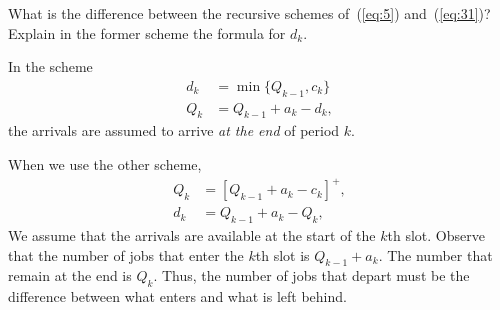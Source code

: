 \begin{question}
  What is the difference between the recursive schemes of~(\ref{eq:5}) and~(\ref{eq:31})? Explain in the former scheme
  the formula for $d_k$.  
\begin{solution}
  In the scheme
  \begin{equation*}
    \begin{split}
      d_k &= \min\{Q_{k-1}, c_k\}\\
Q_k &= Q_{k-1} + a_k - d_k,
    \end{split}
  \end{equation*}
the arrivals are assumed to arrive \emph{at the end} of period $k$. 

When we use the other scheme,
  \begin{equation*}
    \begin{split}
      Q_k &= [Q_{k-1} + a_k - c_k]^+,\\
      d_k &= Q_{k-1} + a_k - Q_k,
    \end{split}
  \end{equation*}
  We assume that the arrivals are available at the start of the $k$th
  slot. Observe that the number of jobs that enter the $k$th slot is
  $Q_{k-1}+a_k$. The number that remain at the end is $Q_k$. Thus, the
  number of jobs that depart must be the difference between what
  enters and what is left behind.
\end{solution}
\end{question}


